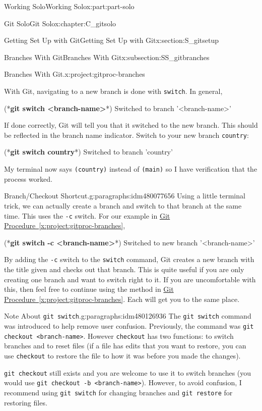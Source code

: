 \documentclass[oneside,10pt,]{book}
\newcommand{\xreffont}{\relax}
\newcommand{\mono}[1]{\texttt{#1}}
\newcommand{\consoleinput}[1]{\textbf{#1}}
\begin{document}
\begin{partptx}{Working Solo}{}{Working Solo}{}{}{x:part:part-solo}
\begin{chapterptx}{Git Solo}{}{Git Solo}{}{}{x:chapter:C_gitsolo}
\begin{sectionptx}{Getting Set Up with Git}{}{Getting Set Up with Git}{}{}{x:section:S_gitsetup}
\begin{subsectionptx}{Branches With Git}{}{Branches With Git}{}{}{x:subsection:SS_gitbranches}
\begin{project}{Branches With Git.}{x:project:gitproc-branches}
\begin{enumerate}[font=\bfseries,label=(\alph*),ref=\alph*]
\par
With Git, navigating to a new branch is done with \mono{switch}. In general,%
\begin{console}{0}{1}{0}
(*\consoleinput{git switch <branch-name>}*)
Switched to branch '<branch-name>'
\end{console}
If done correctly, Git will tell you that it switched to the new branch. This should be reflected in the branch name indicator. Switch to your new branch \mono{country}:%
\begin{console}{0}{1}{0}
(*\consoleinput{git switch country}*)
Switched to branch 'country'
\end{console}
My terminal now says \mono{(country)} instead of \mono{(main)} so I have verification that the process worked.%
\end{enumerate}
\end{project}%
\begin{paragraphs}{Branch\slash{}Checkout Shortcut.}{g:paragraphs:idm480077656}%
Using a little terminal trick, we can actually create a branch and switch to that branch at the same time. This uses the \mono{-c} switch. For our example in \hyperref[x:project:gitproc-branches]{Git Procedure~{\xreffont\ref{x:project:gitproc-branches}}},%
\begin{console}{0}{1}{0}
(*\consoleinput{git switch -c <branch-name>}*)
Switched to new branch '<branch-name>'
\end{console}
By adding the \mono{-c} switch to the \mono{switch} command, Git creates a new branch with the title given and checks out that branch. This is quite useful if you are only creating one branch and want to switch right to it. If you are uncomfortable with this, then feel free to continue using the method in \hyperref[x:project:gitproc-branches]{Git Procedure~{\xreffont\ref{x:project:gitproc-branches}}}. Each will get you to the same place.%
\end{paragraphs}%
\end{subsectionptx}
\begin{paragraphs}{Note About \mono{git switch}.}{g:paragraphs:idm480126936}%
The \mono{git switch} command was introduced to help remove user confusion. Previously, the command was \mono{git checkout <branch-name>}. However \mono{checkout} has two functions: to switch branches and to reset files (if a file has edits that you want to restore, you can use \mono{checkout} to restore the file to how it was before you made the changes).%
\par
\mono{git checkout} still exists and you are welcome to use it to switch branches (you would use \mono{git checkout -b <branch-name>}). However, to avoid confusion, I recommend using \mono{git switch} for changing branches and \mono{git restore} for restoring files.%

\end{paragraphs}
\end{sectionptx}
\end{chapterptx}
\end{partptx}
\end{document}
